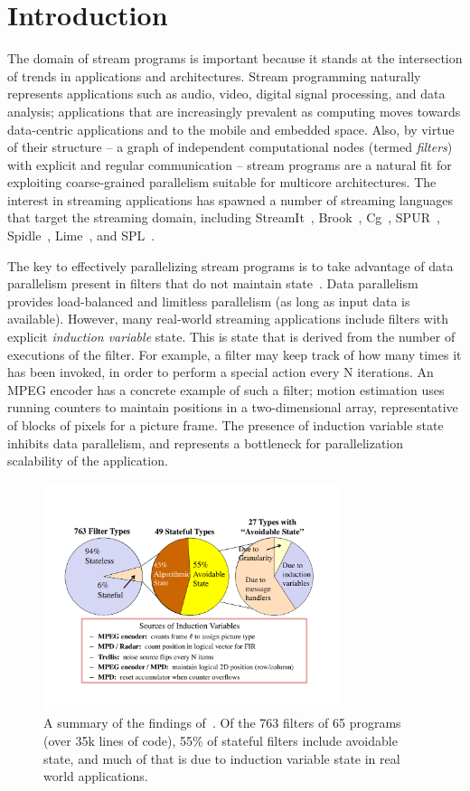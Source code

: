 \section{Introduction}

The domain of stream programs is important because it stands at the
intersection of trends in applications and architectures.  Stream
programming naturally represents applications such as audio, video,
digital signal processing, and data analysis; applications that are
increasingly prevalent as computing moves towards data-centric
applications and to the mobile and embedded space.  Also, by virtue of
their structure -- a graph of independent computational nodes (termed
{\it filters}) with explicit and regular communication -- stream
programs are a natural fit for exploiting coarse-grained parallelism
suitable for multicore architectures.  The interest in streaming
applications has spawned a number of streaming languages that target
the streaming domain, including StreamIt~\cite{streamitcc},
Brook~\cite{brook04}, Cg~\cite{cg03},
SPUR~\cite{spur05samos}, Spidle~\cite{spidle03}, Lime~\cite{lime10},
and SPL~\cite{spl09}.

The key to effectively parallelizing stream programs is to take
advantage of data parallelism present in filters that do not maintain
state~\cite{gordon-asplos06}.  Data parallelism provides load-balanced
and limitless parallelism (as long as input data is
available). However, many real-world streaming applications include
filters with explicit {\it induction variable} state. This is state
that is derived from the number of executions of the filter. For
example, a filter may keep track of how many times it has been
invoked, in order to perform a special action every N iterations. An
MPEG encoder has a concrete example of such a filter; motion estimation
uses running counters to maintain positions in a two-dimensional array,
representative of blocks of pixels for a picture frame.  The
presence of induction variable state inhibits data parallelism, and
represents a bottleneck for parallelization scalability of the
application.

\begin{figure}[t!]
\centering
\includegraphics[width=3.4in]{figures/state-figure.pdf}
\caption{A summary of the findings of~\cite{streamit-suite}.  Of the
  763 filters of 65 programs (over 35k lines of code), 55\% of
  stateful filters include avoidable state, and much of that is due to
  induction variable state in real world
  applications.\protect\label{fig:state}}
\end{figure}


